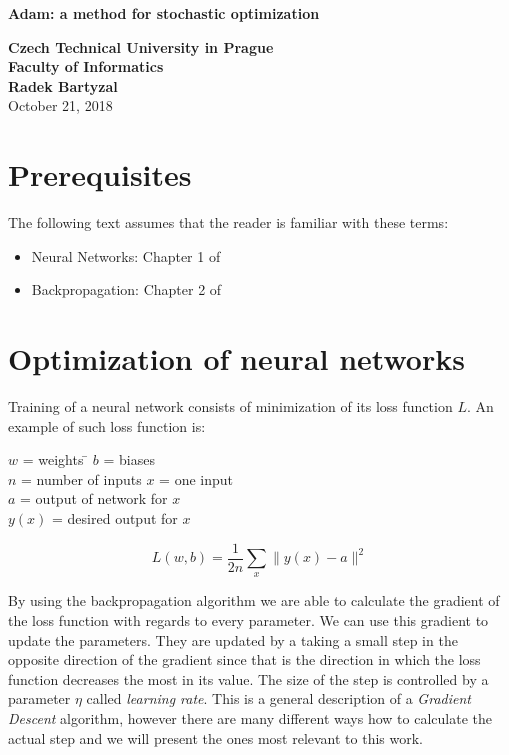 \documentclass[12pt, titlepage]{article}
\author{Radek Bartyzal}
\begin{document}
\begin{titlepage}
    \centering
    \vfill
    {\bfseries\Huge
        Adam: a method for stochastic optimization \\
    }    
        \vskip1cm
        
    {\bfseries\Large 
    Czech Technical University in Prague\\ 
    Faculty of Informatics\\ 
    \vskip1cm
    Radek Bartyzal\\
    }    
    \vskip1cm
    October 21, 2018
    \vfill

    \vfill
    \vfill
\end{titlepage}

\tableofcontents

\section{Prerequisites}
The following text assumes that the reader is familiar with these terms:

\begin{itemize}
\item Neural Networks: Chapter 1 of \cite{cit:nn} 
\item Backpropagation: Chapter 2 of \cite{cit:nn}
\end{itemize}

\section{Optimization of neural networks}\label{sec:optim}
Training of a neural network consists of minimization of its loss function $L$. An example of such loss function is:

\begin{tabbing}
$w$ = weights \hspace{40mm} \= $b$ = biases\\
$n$ = number of inputs \> $x$ = one input\\
$a$ = output of network for $x$\\
$y(x)$ = desired output for $x$
\end{tabbing}
$$
L(w,b) = \frac{1}{2n} \sum_x{ \| y(x) - a \|^2}
$$

By using the backpropagation algorithm we are able to calculate the gradient of the loss function with regards to every parameter. We can use this gradient to update the parameters.
They are updated by a taking a small step in the opposite direction of the gradient since that is the direction in which the loss function decreases the most in its value. The size of the step is controlled by a parameter $\eta$ called \textit{learning rate}. This is a general description of a \textit{Gradient Descent} algorithm, however there are many different ways how to calculate the actual step and we will present the ones most relevant to this work.
\end{document}
